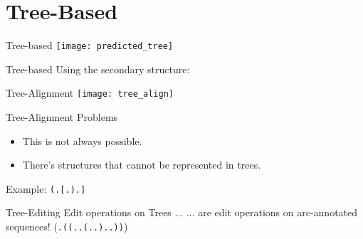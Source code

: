 \section{Tree-Based}


\begin{frame}[c]{Tree-based}
    \texttt{[image: predicted\_tree]}
\end{frame}


\begin{frame}[c]{Tree-based}
    \Large
    Using the secondary structure:
    \newline
    \newline
    \begin{overprint}
    \end{overprint}
\end{frame}


\begin{frame}[c]{Tree-Alignment}
    \texttt{[image: tree\_align]}
\end{frame}

\begin{frame}[c]{Tree-Alignment Problems}
    \Large
    \begin{itemize}[<+(1)->]
        \item This is not always possible.
        \item There's structures that cannot be represented in trees.
        \newline
    \end{itemize}
    \pause
    Example: \texttt{(.[.).]}
\end{frame}



\begin{frame}[c]{Tree-Editing}
    \Large
    Edit operations on Trees ... \newline \pause
    ... are edit operations on arc-annotated sequences! \pause (\texttt{.((..(..)..))})
\end{frame}


